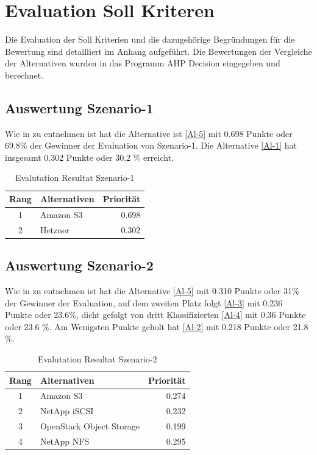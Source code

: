 \section{Evaluation Soll Kriteren}
Die Evaluation der Soll Kriterien und die dazugehörige Begründungen für die Bewertung  sind detailliert im Anhang aufgeführt. Die Bewertungen der Vergleiche der Alternativen wurden in das Programm AHP Decision eingegeben und berechnet.

\subsection{Auswertung Szenario-1}

Wie in  zu entnehmen ist hat die Alternative ist  \ref{Al-5} mit 0.698 Punkte oder 69.8\% der Gewinner der Evaluation von Szenario-1. Die Alternative  \ref{Al-1} hat insgesamt 0.302 Punkte oder 30.2 \% erreicht.

\begin{table}[htbp]
\caption{Evalutation Resultat Szenario-1}
\begin{center}
\begin{tabular}{|c|l|r|}
\hline
Rang & Alternativen & \multicolumn{1}{l|}{Priorität} \\ \hline
1 & Amazon S3 & 0.698 \\ \hline
2 & Hetzner & 0.302 \\ \hline
\end{tabular}
\end{center}
\label{EvalResultS1}
\end{table}


\subsection{Auswertung Szenario-2}

Wie in  zu entnehmen ist hat die Alternative  \ref{Al-5} mit 0.310  Punkte oder 31\% der Gewinner der Evaluation, auf dem zweiten Platz folgt  \ref{Al-3} mit 0.236 Punkte oder 23.6\%, dicht gefolgt von dritt Klassifizierten  \ref{Al-4} mit 0.36 Punkte oder 23.6 \%. Am Wenigsten Punkte geholt hat  \ref{Al-2} mit 0.218 Punkte oder 21.8 \%.

\begin{table}[htbp]
\caption{Evalutation Resultat Szenario-2}
\begin{center}
\begin{tabular}{|c|l|r|}
\hline
Rang &Alternativen & \multicolumn{1}{l|}{Priorität} \\ \hline
1 & Amazon S3 & 0.274  \\ \hline
2 & NetApp iSCSI & 0.232 \\ \hline
3 & OpenStack Object Storage & 0.199 \\ \hline
4 & NetApp NFS & 0.295\\ \hline
\end{tabular}
\end{center}
\label{EvalResultS2}
\end{table}

